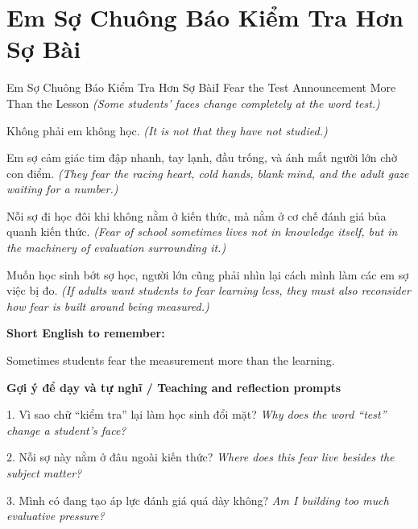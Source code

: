 \section{Em Sợ Chuông Báo Kiểm Tra Hơn Sợ Bài}
\begin{truyen}{Em Sợ Chuông Báo Kiểm Tra Hơn Sợ Bài}{I Fear the Test Announcement More Than the Lesson}
\textit{(Some students' faces change completely at the word test.)}

Không phải em không học.
\textit{(It is not that they have not studied.)}

Em sợ cảm giác tim đập nhanh, tay lạnh, đầu trống, và ánh mắt người lớn chờ con điểm.
\textit{(They fear the racing heart, cold hands, blank mind, and the adult gaze waiting for a number.)}

Nỗi sợ đi học đôi khi không nằm ở kiến thức, mà nằm ở cơ chế đánh giá bủa quanh kiến thức.
\textit{(Fear of school sometimes lives not in knowledge itself, but in the machinery of evaluation surrounding it.)}

\end{truyen}

\begin{baihoc}
Muốn học sinh bớt sợ học, người lớn cũng phải nhìn lại cách mình làm các em sợ việc bị đo.
\textit{(If adults want students to fear learning less, they must also reconsider how fear is built around being measured.)}
\end{baihoc}

\begin{ghinhoanh}
\textbf{Short English to remember:}

Sometimes students fear the measurement more than the learning.

\end{ghinhoanh}

\begin{tuhocnhanh}
\textbf{Gợi ý để dạy và tự nghĩ / Teaching and reflection prompts}

1. Vì sao chữ “kiểm tra” lại làm học sinh đổi mặt? \textit{Why does the word “test” change a student's face?}

2. Nỗi sợ này nằm ở đâu ngoài kiến thức? \textit{Where does this fear live besides the subject matter?}

3. Mình có đang tạo áp lực đánh giá quá dày không? \textit{Am I building too much evaluative pressure?}
\end{tuhocnhanh}
\ngancach

